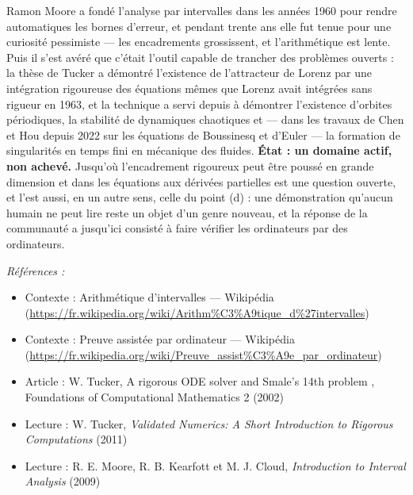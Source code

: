 \documentclass[11pt]{article}
\newenvironment{refs}{\par\small\noindent\emph{Références :}\begin{itemize}\setlength\itemsep{0pt}}{\end{itemize}\normalsize}
\begin{document}
\noindent Ramon Moore a fondé l'analyse par intervalles dans les années 1960 pour rendre automatiques les bornes d'erreur, et pendant trente ans elle fut tenue pour une curiosité pessimiste --- les encadrements grossissent, et l'arithmétique est lente. Puis il s'est avéré que c'était l'outil capable de trancher des problèmes ouverts : la thèse de Tucker a démontré l'existence de l'attracteur de Lorenz par une intégration rigoureuse des équations mêmes que Lorenz avait intégrées sans rigueur en 1963, et la technique a servi depuis à démontrer l'existence d'orbites périodiques, la stabilité de dynamiques chaotiques et --- dans les travaux de Chen et Hou depuis 2022 sur les équations de Boussinesq et d'Euler --- la formation de singularités en temps fini en mécanique des fluides. \textbf{État : un domaine actif, non achevé.} Jusqu'où l'encadrement rigoureux peut être poussé en grande dimension et dans les équations aux dérivées partielles est une question ouverte, et l'est aussi, en un autre sens, celle du point (d) : une démonstration qu'aucun humain ne peut lire reste un objet d'un genre nouveau, et la réponse de la communauté a jusqu'ici consisté à faire vérifier les ordinateurs par des ordinateurs.

\begin{refs}
\item Contexte : Arithmétique d'intervalles --- Wikipédia (\url{https://fr.wikipedia.org/wiki/Arithm%C3%A9tique_d%27intervalles})
\item Contexte : Preuve assistée par ordinateur --- Wikipédia (\url{https://fr.wikipedia.org/wiki/Preuve_assist%C3%A9e_par_ordinateur})
\item Article : W. Tucker, \og{} A rigorous ODE solver and Smale's 14th problem \fg{}, Foundations of Computational Mathematics 2 (2002)
\item Lecture : W. Tucker, \textit{Validated Numerics: A Short Introduction to Rigorous Computations} (2011)
\item Lecture : R. E. Moore, R. B. Kearfott et M. J. Cloud, \textit{Introduction to Interval Analysis} (2009)
\end{refs}

\bigskip
\end{document}

